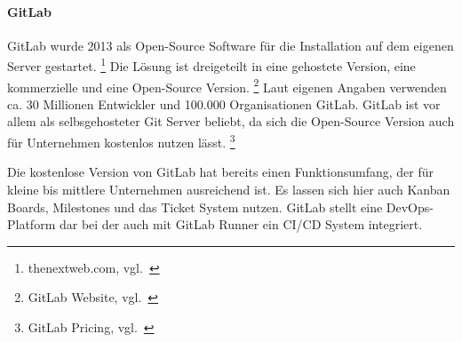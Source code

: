 \paragraph{GitLab}\label{collaboration_gitlab}

GitLab wurde 2013 als Open-Source Software für die Installation auf dem eigenen Server gestartet. \footnote{thenextweb.com, vgl.~\cite{GITLAB_ANOUNCMENT}}
Die Lösung ist dreigeteilt in eine gehostete Version, eine kommerzielle und eine Open-Source Version. \footnote{GitLab Website, vgl.~\cite{GITLAB_ABOUT}}
Laut eigenen Angaben verwenden ca.
30 Millionen Entwickler und 100.000 Organisationen GitLab.
GitLab ist vor allem als selbsgehosteter Git Server beliebt, da sich die Open-Source Version auch für Unternehmen kostenlos nutzen lässt. \footnote{GitLab Pricing, vgl.~\cite{GITLAB_PRICING}}

Die kostenlose Version von GitLab hat bereits einen Funktionsumfang, der für kleine bis mittlere Unternehmen ausreichend ist.
Es lassen sich hier auch Kanban Boards, Milestones und das Ticket System nutzen.
GitLab stellt eine DevOps-Platform dar bei der auch mit GitLab Runner ein CI/CD System integriert.